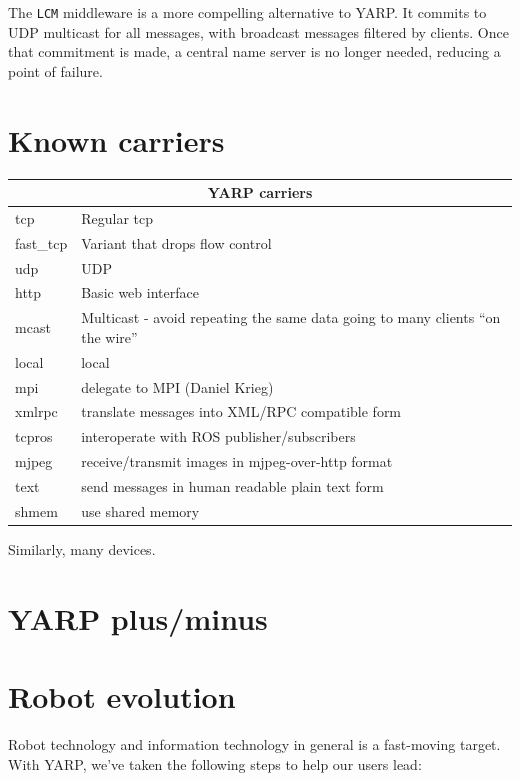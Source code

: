 \documentclass[letterpaper]{article}
\begin{document}
The {\tt LCM} middleware \cite{huang2010lcm} is a more compelling
alternative to YARP.  It commits to UDP multicast for all messages,
with broadcast messages filtered by clients.  Once that commitment is
made, a central name server is no longer needed, reducing a point of
failure.




\clearpage
\newpage


\section{Known carriers}

\begin{tabular}{|l|p{7cm}|}
\hline
\multicolumn{2}{|c|}{YARP carriers} \\
\hline
tcp & Regular tcp \\
fast\_tcp & Variant that drops flow control \\
udp & UDP \\
http & Basic web interface \\
mcast & Multicast - avoid repeating the same data going
to many clients ``on the wire''  \\
local & local \\
mpi & delegate to MPI (Daniel Krieg) \\
xmlrpc & translate messages into XML/RPC compatible form \\
tcpros & interoperate with ROS publisher/subscribers \\
mjpeg & receive/transmit images in mjpeg-over-http format \\
text & send messages in human readable plain text form \\
shmem & use shared memory \\
\hline
\end{tabular}

Similarly, many devices.


\section{YARP plus/minus}


\section{Robot evolution}

Robot technology and information technology in general is a
fast-moving target.  With YARP, we've taken the following steps to
help our users lead:
\end{document}
